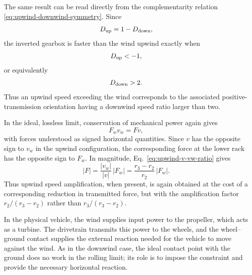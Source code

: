 \documentclass[reprint,aps,pra,longbibliography]{revtex4-2}
\begin{document}
The same result can be read directly from the complementarity relation
\eqref{eq:upwind-downwind-symmetry}.  Since
\[
D_{\rm up}=1-D_{\rm down},
\]
the inverted gearbox is faster than the wind upwind exactly when
\[
D_{\rm up}<-1,
\]
or equivalently
\[
D_{\rm down}>2.
\]
Thus an upwind speed exceeding the wind corresponds to the associated
positive-transmission orientation having a downwind speed ratio larger than
two.

In the ideal, lossless limit, conservation of mechanical power again gives
\[
F_w v_w = F v ,
\]
with forces understood as signed horizontal quantities.  Since \(v\) has the
opposite sign to \(v_w\) in the upwind configuration, the corresponding force
at the lower rack has the opposite sign to \(F_w\).  In magnitude,
Eq.~\eqref{eq:upwind-v-vw-ratio} gives
\begin{equation}
|F|
=
\frac{|v_w|}{|v|}\,|F_w|
=
\frac{r_3-r_2}{r_2}\,|F_w|.
\label{eq:upwind-force-ratio}
\end{equation}
Thus upwind speed amplification, when present, is again obtained at the cost of
a corresponding reduction in transmitted force, but with the amplification
factor \(r_2/(r_3-r_2)\) rather than \(r_3/(r_3-r_2)\).

In the physical vehicle, the wind supplies input power to the propeller, which
acts as a turbine.  The drivetrain transmits this power to the wheels, and the
wheel--ground contact supplies the external reaction needed for the vehicle to
move against the wind.  As in the downwind case, the ideal contact point with
the ground does no work in the rolling limit; its role is to impose the
constraint and provide the necessary horizontal reaction.
\end{document}
